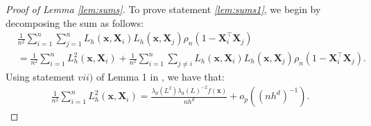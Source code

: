 \documentclass[12pt]{report} %
\newcommand{\bX}{\mathbf{X}}
\newcommand{\bx}{\mathbf{x}}
\newcommand{\bb}{\boldsymbol{b}}
\newcommand{\rd}{\mathrm{d}}
\newcommand{\lrp}[1]{\left(#1\right)}
\newcommand{\norm}[1]{\left|\left| #1\right|\right|}
\begin{document}
\begin{proof}[Proof of Lemma \ref{lem:sums}]

To prove statement \textit{\ref{lem:sums1}}, we begin by decomposing the sum as follows:\begin{align}
&\frac{1}{n^2} \sum_{i=1}^n \sum_{j=1}^n L_h\left(\bx, \bX_i\right) L_h\left(\bx, \bX_j\right) \rho_n\left(1-\bX_i^\top\bX_j\right)\nonumber\\&=\frac{1}{n^2} \sum_{i=1}^n L_h^2\left(\bx, \bX_i\right)+\frac{1}{n^2} \sum_{i=1}^n\sum_{j\neq i} L_h\left(\bx, \bX_i\right)L_h\left(\bx, \bX_j\right)  \rho_n\left(1-\bX_i^\top\bX_j\right).\label{eq:lemmai}
\end{align}
Using statement $vii)$ of Lemma 1 in \citet{Garcia-Portugues2016}, we have that:
\begin{align}\frac{1}{n^2} \sum_{i=1}^n L_h^2\left(\bx, \bX_i\right) =\frac{\lambda_d\left(L^2\right) \lambda_d(L)^{-2}f(\bx)}{nh^d}+o_p\lrp{\lrp{n h^d}^{-1}}.\label{eq:lemmai1}\end{align}


\end{proof}
\end{document}
